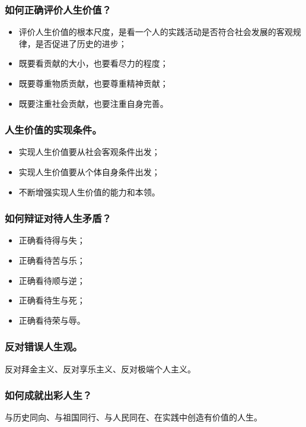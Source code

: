 \documentclass{article}
\begin{document}
\subsubsection{如何正确评价人生价值？}
\begin{itemize}
    \item 评价人生价值的根本尺度，是看一个人的实践活动是否符合社会发展的客观规律，是否促进了历史的进步；
    \item 既要看贡献的大小，也要看尽力的程度；
    \item 既要尊重物质贡献，也要尊重精神贡献；
    \item 既要注重社会贡献，也要注重自身完善。
\end{itemize}

\subsubsection{人生价值的实现条件。}
\begin{itemize}
    \item 实现人生价值要从社会客观条件出发；
    \item 实现人生价值要从个体自身条件出发；
    \item 不断增强实现人生价值的能力和本领。
\end{itemize}

\subsubsection{如何辩证对待人生矛盾？}
\begin{itemize}
    \item 正确看待得与失；
    \item 正确看待苦与乐；
    \item 正确看待顺与逆；
    \item 正确看待生与死；
    \item 正确看待荣与辱。
\end{itemize}

\subsubsection{反对错误人生观。}
反对拜金主义、反对享乐主义、反对极端个人主义。

\subsubsection{如何成就出彩人生？}
与历史同向、与祖国同行、与人民同在、在实践中创造有价值的人生。
\end{document}
